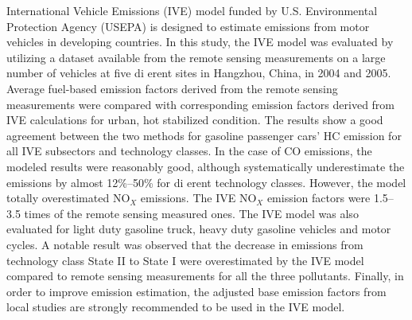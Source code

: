 International Vehicle Emissions (IVE) model funded by U.S. Environmental Protection Agency (USEPA) is designed to estimate emissions from motor vehicles in developing countries. In this study, the IVE model was evaluated by utilizing a dataset available from the remote sensing measurements on a large number of vehicles at five di erent sites in Hangzhou, China, in 2004 and 2005. Average fuel-based emission factors derived from the remote sensing measurements were compared with corresponding emission factors derived from IVE calculations for urban, hot stabilized condition. The results show a good agreement between the two methods for gasoline passenger cars’ HC emission for all IVE subsectors and technology classes. In the case of CO emissions, the modeled results were reasonably good, although systematically underestimate the emissions by almost 12\%–50\% for di erent technology classes. However, the model totally overestimated NO$_X$ emissions. The IVE NO$_X$ emission factors were 1.5–3.5 times of the remote sensing measured ones. The IVE model was also evaluated for light duty gasoline truck, heavy duty gasoline vehicles and motor cycles. A notable result was observed that the decrease in emissions from technology class State II to State I were overestimated by the IVE model compared to remote sensing measurements for all the three pollutants. Finally, in order to improve emission estimation, the adjusted base emission factors from local studies are strongly recommended to be used in the IVE model.
